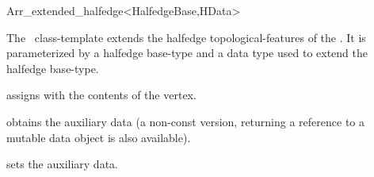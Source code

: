 
\ccRefPageBegin

\begin{ccRefClass}{Arr_extended_halfedge<HalfedgeBase,HData>}

\ccThreeToTwo

\ccDefinition
  The \ccRefName\ class-template extends the halfedge topological-features of
  the \dcel. It is parameterized by a halfedge base-type 
  and a data type  used to extend the halfedge base-type.


\ccIsModel

\ccInheritsFrom

\ccCreation
{}
  {assigns \ccVar{} with the contents of the  vertex.}

\ccAccessFunctions

\def\ccLongParamLayout{\ccTrue}
  {obtains the auxiliary data (a non-const version, returning a reference
   to a mutable data object is also available).}
\def\ccLongParamLayout{\ccFalse}

\ccModifiers
  {sets the auxiliary data.}

\ccSeeAlso

\end{ccRefClass}

\ccRefPageEnd
